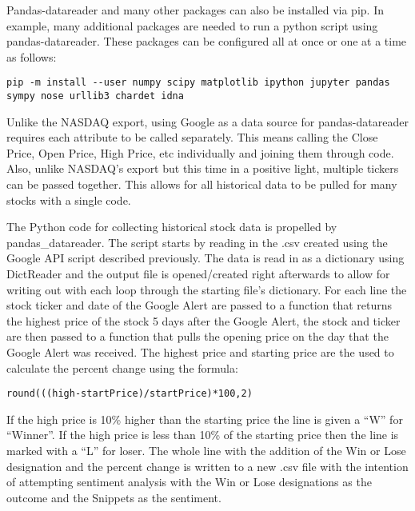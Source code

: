 \documentclass[sigconf]{acmart}
\begin{document}
Pandas-datareader and many other packages can also be installed via pip. In example, many additional packages are needed to run a python script using pandas-datareader. These packages can be configured all at once or one at a time as follows:
\begin{mdframed}[style=default]
\begin{lstlisting}
pip -m install --user numpy scipy matplotlib ipython jupyter pandas sympy nose urllib3 chardet idna
\end{lstlisting}
\end{mdframed}

Unlike the NASDAQ export, using Google as a data source for pandas-datareader requires each attribute to be called separately. This means calling the Close Price, Open Price, High Price, etc individually and joining them through code. Also, unlike NASDAQ's export but this time in a positive light, multiple tickers can be passed together. This allows for all historical data to be pulled for many stocks with a single code. 

The Python code for collecting historical stock data is propelled by pandas\_datareader. The script starts by reading in the .csv created using the Google API script described previously. The data is read in as a dictionary using DictReader and the output file is opened/created right afterwards to allow for writing out with each loop through the starting file's dictionary. For each line the stock ticker and date of the Google Alert are passed to a function that returns the highest price of the stock 5 days after the Google Alert, the stock and ticker are then passed to a function that pulls the opening price on the day that the Google Alert was received. The highest price and starting price are the used to calculate the percent change using the formula: 
\begin{mdframed}[style=default]
\begin{lstlisting}
round(((high-startPrice)/startPrice)*100,2)
\end{lstlisting}
\end{mdframed}
If the high price is 10\% higher than the starting price the line is given a ``W'' for ``Winner''. If the high price is less than 10\% of the starting price then the line is marked with a ``L'' for loser. The whole line with the addition of the Win or Lose  designation and the percent change is written to a new .csv file with the intention of attempting sentiment analysis with the Win or Lose designations as the outcome and the Snippets as the sentiment. 
\end{document}
